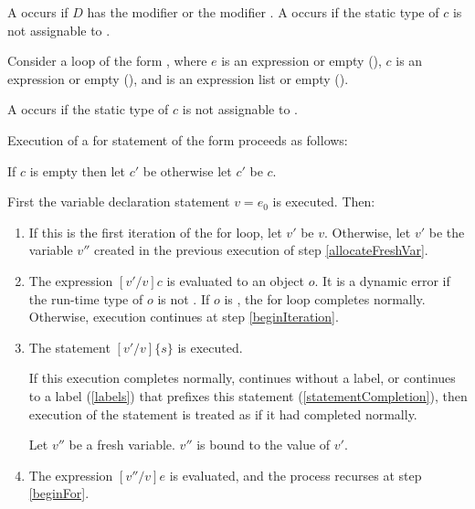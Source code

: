 \documentclass[makeidx]{article}
\begin{document}
\LMHash{}%
A  occurs if $D$ has
the modifier \CONST{} or the modifier \LATE.
A  occurs if the static type of $c$ is not
assignable to .

\LMHash{}%
Consider a loop of the form
,
where $e$ is an expression or empty
(),
$c$ is an expression or empty
(),
and  is an expression list or empty
().

\LMHash{}%
A  occurs if the static type of $c$ is not
assignable to .

\LMHash{}%
Execution of a for statement of the form
 proceeds as follows:

\LMHash{}%
If $c$ is empty then let $c'$ be \TRUE{} otherwise let $c'$ be $c$.

\LMHash{}%
First the variable declaration statement \VAR{} $v = e_0$ is executed.
Then:
\begin{enumerate}
\item
  \label{beginFor}
  If this is the first iteration of the for loop, let $v'$ be $v$.
  Otherwise, let $v'$ be the variable $v''$ created in
  the previous execution of step \ref{allocateFreshVar}.
\item
  The expression $[v'/v]c$ is evaluated to an object $o$.
  It is a dynamic error if the run-time type of $o$ is not .
  If $o$ is \FALSE, the for loop completes normally.
  Otherwise, execution continues at step \ref{beginIteration}.
\item
  \label{beginIteration}
  The statement $[v'/v]\{s\}$ is executed.

  If this execution completes normally, continues without a label,
  or continues to a label (\ref{labels})
  that prefixes this \FOR{} statement (\ref{statementCompletion}),
  then execution of the statement is treated as if it had completed normally.

  \label{allocateFreshVar}
  Let $v''$ be a fresh variable.
  $v''$ is bound to the value of $v'$.
\item
  The expression $[v''/v]e$ is evaluated, and
  the process recurses at step \ref{beginFor}.
\end{enumerate}
\end{document}
